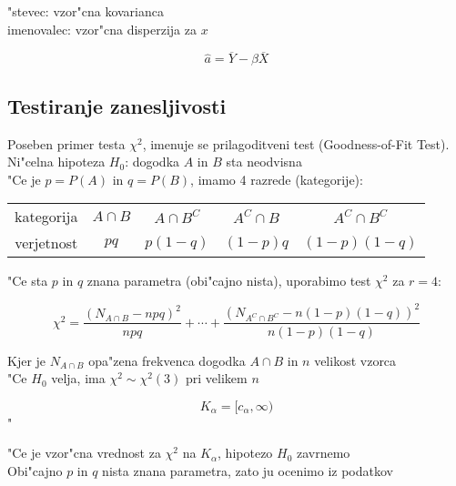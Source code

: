 \documentclass[a4paper,12pt]{article}
\theoremstyle{definition}
\theoremstyle{remark}
\begin{document}
"stevec: vzor"cna kovarianca \\
imenovalec: vzor"cna disperzija za $x$

\begin{equation*}
    \hat{a} = \overline{Y} - \beta \overline{X}
\end{equation*}


\subsection{Testiranje zanesljivosti}

Poseben primer testa $\chi^2$, imenuje se prilagoditveni test (Goodness-of-Fit Test). \\
Ni"celna hipoteza $H_0$: dogodka $A$ in $B$ sta neodvisna \\
"Ce je $p = P(A)$ in $q = P(B)$, imamo 4 razrede (kategorije):

\begin{center}
    \begin{tabular}{c c c c c} 
        \hline
        kategorija & $A \cap B$ & $A \cap B^C$ & $A^C \cap B$ & $A^C \cap B^C$ \\
        verjetnost & $pq$ & $p(1-q)$ & $(1-p)q$ & $(1-p)(1-q)$
    \end{tabular}
\end{center}

"Ce sta $p$ in $q$ znana parametra (obi"cajno nista), uporabimo test $\chi^2$ za $r=4$:

\begin{equation*}
    \chi^2 = \frac{(N_{A \cap B} - npq)^2}{npq} + \cdots + \frac{(N_{A^C \cap B^C} - n(1-p)(1-q))^2}{n(1-p)(1-q)}
\end{equation*}

Kjer je $N_{A \cap B}$ opa"zena frekvenca dogodka $A \cap B$ in $n$ velikost vzorca \\
"Ce $H_0$ velja, ima $\chi^2 \sim \chi^2(3)$ pri velikem $n$


\begin{equation*}
    K_{\alpha} = [c_{\alpha}, \infty)
\end{equation*}"

"Ce je vzor"cna vrednost za $\chi^2$ na $K_{\alpha}$, hipotezo $H_0$ zavrnemo \\
Obi"cajno $p$ in $q$ nista znana parametra, zato ju ocenimo iz podatkov \\
\end{document}

